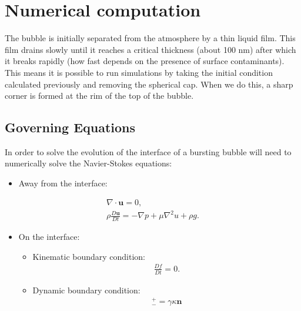 \section{Numerical computation}

The bubble is initially separated from the atmosphere by a thin liquid film. This film drains slowly until it reaches a critical thickness (about 100 nm) after which it breaks rapidly (how fast depends on the presence of surface contaminants). This means it is possible to run simulations by taking the initial condition calculated previously and removing the spherical cap. When we do this, a sharp corner is formed at the rim of the top of the bubble.

\subsection{Governing Equations}

In order to solve the evolution of the interface of a bursting bubble will need to numerically solve the Navier-Stokes equations:
\begin{itemize}
    \item Away from the interface:
\end{itemize}
\begin{align}
    \nabla \cdot \textbf{u}=0, \\
    \rho \frac{D \textbf{u}}{D t} = -\nabla p + \mu \nabla^2 u + \rho g.
\end{align}
\begin{itemize}
    \item On the interface:
    \begin{itemize}
        \item Kinematic boundary condition:
        \begin{align}
            \frac{D f}{D t} = 0.
            
        \end{align}
        \item Dynamic boundary condition:
        \begin{align}
            [\textbf{Tn}]^+_-= \gamma \kappa \textbf{n}
        \end{align}
    \end{itemize}
\end{itemize}